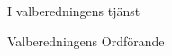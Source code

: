 \documentclass[../_main/handlingar.tex]{subfiles}
\begin{document}

\begin{signatures}{1}
    I valberedningens tjänst
    \signature{Elin Magnusson}{Valberedningens Ordförande}
\end{signatures}
\end{document}
